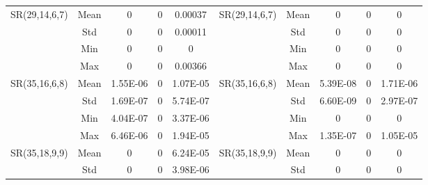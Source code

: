 \documentclass[letterpaper]{article} \usepackage{aaai24}  \usepackage{times}  \usepackage{helvet}  \usepackage{courier}  \usepackage[hyphens]{url}  \usepackage{graphicx} \urlstyle{rm} \def\UrlFont{\rm}  \usepackage{natbib}  \usepackage{caption} \frenchspacing  \setlength{\pdfpagewidth}{8.5in} \setlength{\pdfpageheight}{11in} \usepackage{algorithm}
\begin{document}
\begin{table*}[t]
{\begin{tabular}{@{}ccccc|ccccc@{}}
\multicolumn{1}{c|}{\multirow{4}{*}{SR(29,14,6,7)}} & \multicolumn{1}{c|}{Mean} & 0         & 0         & 0.00037  & \multicolumn{1}{c|}{\multirow{4}{*}{SR(29,14,6,7)}} & \multicolumn{1}{c|}{Mean} & 0         & 0         & 0        \\
\multicolumn{1}{c|}{}                               & \multicolumn{1}{c|}{Std}  & 0         & 0         & 0.00011  & \multicolumn{1}{c|}{}                               & \multicolumn{1}{c|}{Std}  & 0         & 0         & 0        \\
\multicolumn{1}{c|}{}                               & \multicolumn{1}{c|}{Min}  & 0         & 0         & 0        & \multicolumn{1}{c|}{}                               & \multicolumn{1}{c|}{Min}  & 0         & 0         & 0        \\
\multicolumn{1}{c|}{}                               & \multicolumn{1}{c|}{Max}  & 0         & 0         & 0.00366  & \multicolumn{1}{c|}{}                               & \multicolumn{1}{c|}{Max}  & 0         & 0         & 0        \\ \midrule
\multicolumn{1}{c|}{\multirow{4}{*}{SR(35,16,6,8)}} & \multicolumn{1}{c|}{Mean} & 1.55E-06  & 0         & 1.07E-05 & \multicolumn{1}{c|}{\multirow{4}{*}{SR(35,16,6,8)}} & \multicolumn{1}{c|}{Mean} & 5.39E-08  & 0         & 1.71E-06 \\
\multicolumn{1}{c|}{}                               & \multicolumn{1}{c|}{Std}  & 1.69E-07  & 0         & 5.74E-07 & \multicolumn{1}{c|}{}                               & \multicolumn{1}{c|}{Std}  & 6.60E-09  & 0         & 2.97E-07 \\
\multicolumn{1}{c|}{}                               & \multicolumn{1}{c|}{Min}  & 4.04E-07  & 0         & 3.37E-06 & \multicolumn{1}{c|}{}                               & \multicolumn{1}{c|}{Min}  & 0         & 0         & 0        \\
\multicolumn{1}{c|}{}                               & \multicolumn{1}{c|}{Max}  & 6.46E-06  & 0         & 1.94E-05 & \multicolumn{1}{c|}{}                               & \multicolumn{1}{c|}{Max}  & 1.35E-07  & 0         & 1.05E-05 \\ \midrule
\multicolumn{1}{c|}{\multirow{4}{*}{SR(35,18,9,9)}} & \multicolumn{1}{c|}{Mean} & 0         & 0         & 6.24E-05 & \multicolumn{1}{c|}{\multirow{4}{*}{SR(35,18,9,9)}} & \multicolumn{1}{c|}{Mean} & 0         & 0         & 0        \\
\multicolumn{1}{c|}{}                               & \multicolumn{1}{c|}{Std}  & 0         & 0         & 3.98E-06 & \multicolumn{1}{c|}{}                               & \multicolumn{1}{c|}{Std}  & 0         & 0         & 0        \\

\end{tabular}}
\end{table*}
\end{document}
